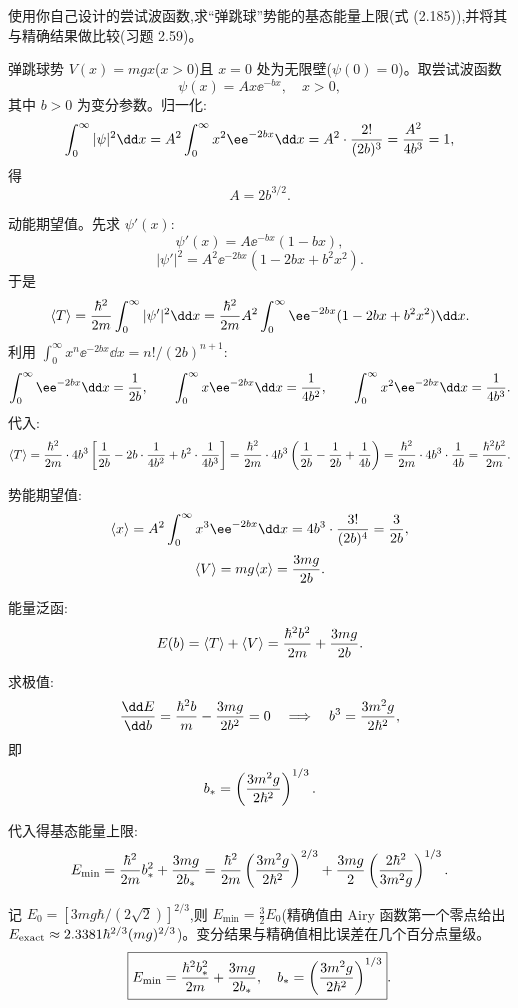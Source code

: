 \begin{question}
使用你自己设计的尝试波函数,求“弹跳球”势能的基态能量上限(式 (2.185)),并将其与精确结果做比较(习题 2.59)。

\par\smallskip
{}

\begin{solution}
弹跳球势 $V(x)=mgx$($x>0$)且 $x=0$ 处为无限壁($\psi(0)=0$)。取尝试波函数
\[
\psi(x)=Ax\ee^{-bx},\quad x>0,
\]
其中 $b>0$ 为变分参数。归一化:
\[
\int_0^\infty|\psi|^2\dd x=A^2\int_0^\infty x^2\ee^{-2bx}\dd x
=A^2\cdot{2!\over(2b)^3}={A^2\over4b^3}=1,
\]
得
\[
A=2b^{3/2}.
\]

动能期望值。先求 $\psi'(x)$:
\[
\psi'(x)=A\ee^{-bx}(1-bx),
\]
\[
|\psi'|^2=A^2\ee^{-2bx}(1-2bx+b^2x^2).
\]
于是
\[
\langle T\rangle={\hbar^2\over2m}\int_0^\infty|\psi'|^2\dd x
={\hbar^2\over2m}A^2\int_0^\infty \ee^{-2bx}(1-2bx+b^2x^2)\dd x.
\]
利用 $\int_0^\infty x^n \ee^{-2bx}\dd x=n!/(2b)^{n+1}$:
\[
\int_0^\infty \ee^{-2bx}\dd x={1\over2b},\qquad
\int_0^\infty x \ee^{-2bx}\dd x={1\over4b^2},\qquad
\int_0^\infty x^2 \ee^{-2bx}\dd x={1\over4b^3}.
\]
代入:
\[
\langle T\rangle={\hbar^2\over2m}\cdot4b^3\left[{1\over2b}-2b\cdot{1\over4b^2}+b^2\cdot{1\over4b^3}\right]
={\hbar^2\over2m}\cdot4b^3\left({1\over2b}-{1\over2b}+{1\over4b}\right)
={\hbar^2\over2m}\cdot4b^3\cdot{1\over4b}
={\hbar^2b^2\over2m}.
\]

势能期望值:
\[
\langle x\rangle=A^2\int_0^\infty x^3\ee^{-2bx}\dd x
=4b^3\cdot{3!\over(2b)^4}={3\over2b},
\]
\[
\langle V\rangle=mg\langle x\rangle={3mg\over2b}.
\]

能量泛函:
\[
E(b)=\langle T\rangle+\langle V\rangle
={\hbar^2b^2\over2m}+{3mg\over2b}.
\]

求极值:
\[
{\dd E\over\dd b}={\hbar^2b\over m}-{3mg\over2b^2}=0
\quad\Longrightarrow\quad
b^3={3m^2g\over2\hbar^2},
\]
即
\[
b_*=\left({3m^2g\over2\hbar^2}\right)^{1/3}.
\]

代入得基态能量上限:
\[
E_{\min}={\hbar^2\over2m}b_*^2+{3mg\over2b_*}
={\hbar^2\over2m}\left({3m^2g\over2\hbar^2}\right)^{2/3}
+{3mg\over2}\left({2\hbar^2\over3m^2g}\right)^{1/3}.
\]

记 $E_0=[3mg\hbar/(2\sqrt2)]^{2/3}$,则 $E_{\min}=\frac32E_0$(精确值由 Airy 函数第一个零点给出 $E_{\rm exact}\approx2.3381\hbar^{2/3}(mg)^{2/3}$)。变分结果与精确值相比误差在几个百分点量级。
\[
\boxed{E_{\min}={\hbar^2b_*^2\over2m}+{3mg\over2b_*},\quad b_*=\left({3m^2g\over2\hbar^2}\right)^{1/3}}.
\]
\end{solution}
\end{question}

